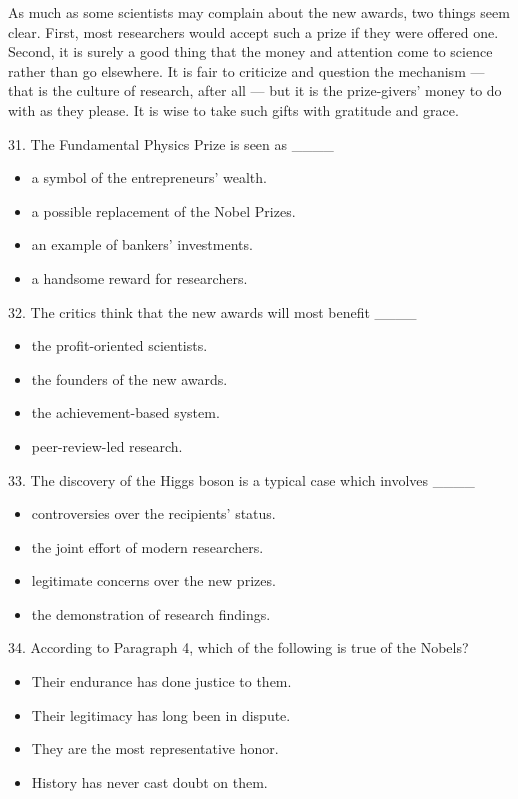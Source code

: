 \documentclass[UTF8,11pt]{ctexart}
\begin{document}
As much as some scientists may complain about the new awards, two things seem clear. First, most researchers would accept such a prize if they were offered one. Second, it is surely a good thing that the money and attention come to science rather than go elsewhere. It is fair to criticize and question the mechanism — that is the culture of research, after all — but it is the prize-givers’ money to do with as they please. It is wise to take such gifts with gratitude and grace.


31. The Fundamental Physics Prize is seen as \_\_\_\_


\begin{itemize}[leftmargin=2em,itemsep=.2em,topsep=.4em]\item[A.] a symbol of the entrepreneurs’ wealth.
\item[B.] a possible replacement of the Nobel Prizes.
\item[C.] an example of bankers’ investments.
\item[D.] a handsome reward for researchers.
\end{itemize}

32. The critics think that the new awards will most benefit \_\_\_\_


\begin{itemize}[leftmargin=2em,itemsep=.2em,topsep=.4em]\item[A.] the profit-oriented scientists.
\item[B.] the founders of the new awards.
\item[C.] the achievement-based system.
\item[D.] peer-review-led research.
\end{itemize}

33. The discovery of the Higgs boson is a typical case which involves \_\_\_\_


\begin{itemize}[leftmargin=2em,itemsep=.2em,topsep=.4em]\item[A.] controversies over the recipients’ status.
\item[B.] the joint effort of modern researchers.
\item[C.] legitimate concerns over the new prizes.
\item[D.] the demonstration of research findings.
\end{itemize}

34. According to Paragraph 4, which of the following is true of the Nobels?


\begin{itemize}[leftmargin=2em,itemsep=.2em,topsep=.4em]\item[A.] Their endurance has done justice to them.
\item[B.] Their legitimacy has long been in dispute.
\item[C.] They are the most representative honor.
\item[D.] History has never cast doubt on them.
\end{itemize}
\end{document}
